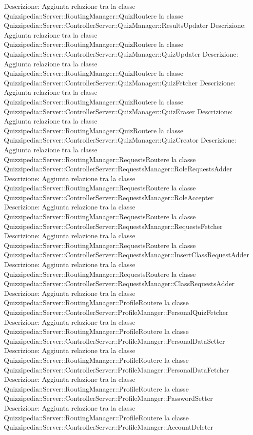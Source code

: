 Descrizione: Aggiunta relazione tra la classe Quizzipedia::Server::RoutingManager::QuizRoutere la classe Quizzipedia::Server::ControllerServer::QuizManager::ResultsUpdater 
Descrizione: Aggiunta relazione tra la classe Quizzipedia::Server::RoutingManager::QuizRoutere la classe Quizzipedia::Server::ControllerServer::QuizManager::QuizUpdater 
Descrizione: Aggiunta relazione tra la classe Quizzipedia::Server::RoutingManager::QuizRoutere la classe Quizzipedia::Server::ControllerServer::QuizManager::QuizFetcher 
Descrizione: Aggiunta relazione tra la classe Quizzipedia::Server::RoutingManager::QuizRoutere la classe Quizzipedia::Server::ControllerServer::QuizManager::QuizEraser 
Descrizione: Aggiunta relazione tra la classe Quizzipedia::Server::RoutingManager::QuizRoutere la classe Quizzipedia::Server::ControllerServer::QuizManager::QuizCreator 
Descrizione: Aggiunta relazione tra la classe Quizzipedia::Server::RoutingManager::RequestsRoutere la classe Quizzipedia::Server::ControllerServer::RequestsManager::RoleRequestsAdder 
Descrizione: Aggiunta relazione tra la classe Quizzipedia::Server::RoutingManager::RequestsRoutere la classe Quizzipedia::Server::ControllerServer::RequestsManager::RoleAccepter 
Descrizione: Aggiunta relazione tra la classe Quizzipedia::Server::RoutingManager::RequestsRoutere la classe Quizzipedia::Server::ControllerServer::RequestsManager::RequestsFetcher 
Descrizione: Aggiunta relazione tra la classe Quizzipedia::Server::RoutingManager::RequestsRoutere la classe Quizzipedia::Server::ControllerServer::RequestsManager::InsertClassRequestAdder 
Descrizione: Aggiunta relazione tra la classe Quizzipedia::Server::RoutingManager::RequestsRoutere la classe Quizzipedia::Server::ControllerServer::RequestsManager::ClassRequestsAdder 
Descrizione: Aggiunta relazione tra la classe Quizzipedia::Server::RoutingManager::ProfileRoutere la classe Quizzipedia::Server::ControllerServer::ProfileManager::PersonalQuizFetcher 
Descrizione: Aggiunta relazione tra la classe Quizzipedia::Server::RoutingManager::ProfileRoutere la classe Quizzipedia::Server::ControllerServer::ProfileManager::PersonalDataSetter 
Descrizione: Aggiunta relazione tra la classe Quizzipedia::Server::RoutingManager::ProfileRoutere la classe Quizzipedia::Server::ControllerServer::ProfileManager::PersonalDataFetcher 
Descrizione: Aggiunta relazione tra la classe Quizzipedia::Server::RoutingManager::ProfileRoutere la classe Quizzipedia::Server::ControllerServer::ProfileManager::PasswordSetter 
Descrizione: Aggiunta relazione tra la classe Quizzipedia::Server::RoutingManager::ProfileRoutere la classe Quizzipedia::Server::ControllerServer::ProfileManager::AccountDeleter 
